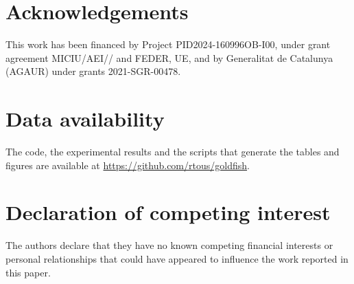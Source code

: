 \documentclass[times,twocolumn,final,authoryear]{elsarticle}
\begin{document}
\section*{Acknowledgements}
This work has been financed by Project PID2024-160996OB-I00, under grant agreement MICIU/\allowbreak AEI// and FEDER, UE, and by Generalitat de Catalunya (AGAUR) under grants 2021-SGR-00478.

\section*{Data availability}
The code, the experimental results and the scripts that generate the tables and figures are available at \url{https://github.com/rtous/goldfish}.

\section*{Declaration of competing interest}
The authors declare that they have no known competing financial interests or personal relationships that could have appeared to influence the work reported in this paper.



\end{document}
